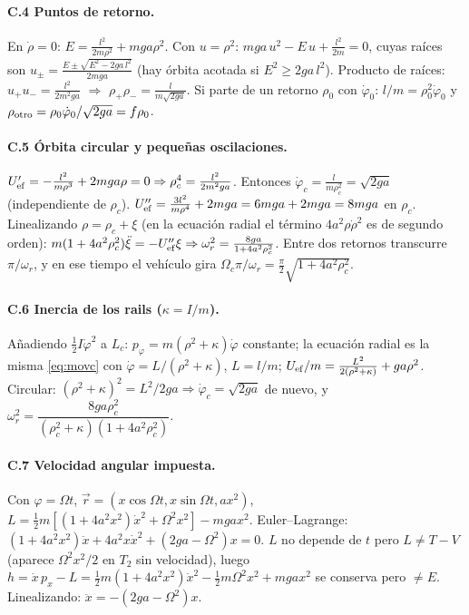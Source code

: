 \documentclass[11pt,a4paper]{article}
\begin{document}
\paragraph{C.4 Puntos de retorno.}
En $\dot\rho=0$: $E=\frac{l^2}{2m\rho^2}+mga\rho^2$. Con $u=\rho^2$: $mga\,u^2-E\,u+\frac{l^2}{2m}=0$, cuyas raíces son
$u_\pm=\frac{E\pm\sqrt{E^2-2ga\,l^2}}{2mga}$ (hay órbita acotada si $E^2\geq2ga\,l^2$). Producto de raíces: $u_+u_-=\frac{l^2}{2m^2ga}$ $\Rightarrow$ $\rho_+\rho_-=\frac{l}{m\sqrt{2ga}}$.
Si parte de un retorno $\rho_0$ con $\dot\varphi_0$: $l/m=\rho_0^2\dot\varphi_0$ y $\rho_{\rm otro}=\rho_0\dot\varphi_0/\sqrt{2ga}=f\rho_0$.

\paragraph{C.5 Órbita circular y pequeñas oscilaciones.}
$U_{\rm ef}'=-\frac{l^2}{m\rho^3}+2mga\rho=0\Rightarrow\rho_c^4=\frac{l^2}{2m^2ga}$. Entonces $\dot\varphi_c=\frac{l}{m\rho_c^2}=\sqrt{2ga}$ (independiente de $\rho_c$).
$U_{\rm ef}''=\frac{3l^2}{m\rho^4}+2mga=6mga+2mga=8mga$ en $\rho_c$. Linealizando $\rho=\rho_c+\xi$ (en la ecuación radial el término $4a^2\rho\dot\rho^2$ es de segundo orden):
$m(1+4a^2\rho_c^2)\ddot\xi=-U_{\rm ef}''\xi\Rightarrow\omega_r^2=\frac{8ga}{1+4a^2\rho_c^2}$. Entre dos retornos transcurre $\pi/\omega_r$, y en ese tiempo el vehículo gira $\Omega_c\pi/\omega_r=\frac\pi2\sqrt{1+4a^2\rho_c^2}$.

\paragraph{C.6 Inercia de los rails ($\kappa=I/m$).}
Añadiendo $\tfrac12I\dot\varphi^2$ a $L_c$: $p_\varphi=m(\rho^2+\kappa)\dot\varphi$ constante; la ecuación radial es la misma \eqref{eq:movc} con $\dot\varphi=L/(\rho^2+\kappa)$, $L=l/m$;
$U_{\rm ef}/m=\frac{L^2}{2(\rho^2+\kappa)}+ga\rho^2$. Circular: $(\rho^2+\kappa)^2=L^2/2ga\Rightarrow\dot\varphi_c=\sqrt{2ga}$ de nuevo, y
$\omega_r^2=\dfrac{8ga\rho_c^2}{(\rho_c^2+\kappa)(1+4a^2\rho_c^2)}$.

\paragraph{C.7 Velocidad angular impuesta.}
Con $\varphi=\Omega t$, $\vec r=(x\cos\Omega t,x\sin\Omega t,ax^2)$, $L=\tfrac12m[(1+4a^2x^2)\dot x^2+\Omega^2x^2]-mgax^2$.
Euler--Lagrange: $(1+4a^2x^2)\ddot x+4a^2x\dot x^2+(2ga-\Omega^2)x=0$. $L$ no depende de $t$ pero $L\neq T-V$
(aparece $\Omega^2x^2/2$ en $T_2$ sin velocidad), luego $h=\dot x\,p_x-L=\tfrac12m(1+4a^2x^2)\dot x^2-\tfrac12m\Omega^2x^2+mgax^2$ se conserva pero $\neq E$.
Linealizando: $\ddot x=-(2ga-\Omega^2)x$.
\end{document}
